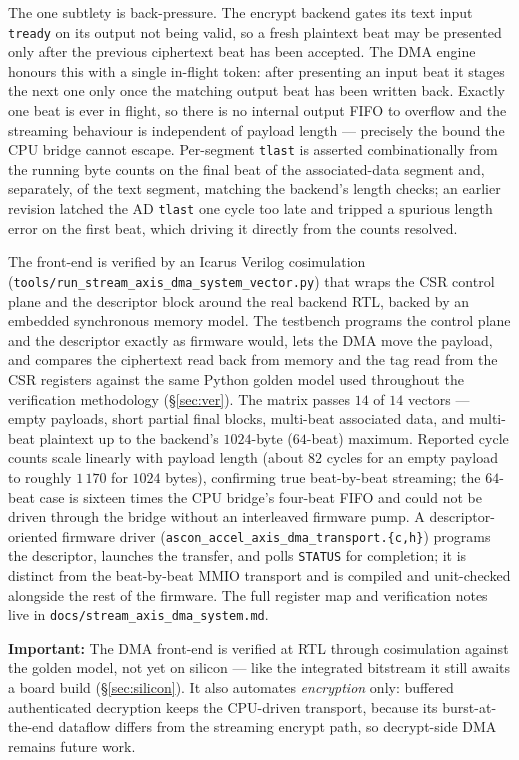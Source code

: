 \documentclass[11pt,a4paper]{article}
\newcommand{\warn}[1]{%
  \begin{tcolorbox}[
    enhanced, colback=warnbg, colframe=warnframe,
    arc=2pt, boxrule=0.5pt, left=6pt, right=6pt, top=3pt, bottom=3pt,
    before upper={\small}
  ]
  \textbf{\color{warnframe}Important:} #1
  \end{tcolorbox}\vspace{3pt}}
\begin{document}
The one subtlety is back-pressure. The encrypt backend gates its text
input \texttt{tready} on its output not being valid, so a fresh
plaintext beat may be presented only after the previous ciphertext beat
has been accepted. The DMA engine honours this with a single in-flight
token: after presenting an input beat it stages the next one only once
the matching output beat has been written back. Exactly one beat is ever
in flight, so there is no internal output FIFO to overflow and the
streaming behaviour is independent of payload length --- precisely the
bound the CPU bridge cannot escape. Per-segment \texttt{tlast} is
asserted combinationally from the running byte counts on the final beat
of the associated-data segment and, separately, of the text segment,
matching the backend's length checks; an earlier revision latched the AD
\texttt{tlast} one cycle too late and tripped a spurious length error on
the first beat, which driving it directly from the counts resolved.

The front-end is verified by an Icarus Verilog cosimulation
(\texttt{tools/run\_stream\_axis\_dma\_system\_vector.py}) that wraps the
CSR control plane and the descriptor block around the real backend RTL,
backed by an embedded synchronous memory model. The testbench programs
the control plane and the descriptor exactly as firmware would, lets the
DMA move the payload, and compares the ciphertext read back from memory
and the tag read from the CSR registers against the same Python golden
model used throughout the verification methodology (§\ref{sec:ver}). The
matrix passes $14$ of $14$ vectors --- empty payloads, short partial
final blocks, multi-beat associated data, and multi-beat plaintext up to
the backend's $1024$-byte ($64$-beat) maximum. Reported cycle counts
scale linearly with payload length (about $82$ cycles for an empty
payload to roughly $1\,170$ for $1024$ bytes), confirming true
beat-by-beat streaming; the $64$-beat case is sixteen times the CPU
bridge's four-beat FIFO and could not be driven through the bridge
without an interleaved firmware pump. A descriptor-oriented firmware
driver (\texttt{ascon\_accel\_axis\_dma\_transport.\{c,h\}}) programs the
descriptor, launches the transfer, and polls \texttt{STATUS} for
completion; it is distinct from the beat-by-beat MMIO transport and is
compiled and unit-checked alongside the rest of the firmware. The full
register map and verification notes live in
\texttt{docs/stream\_axis\_dma\_system.md}.

\warn{The DMA front-end is verified at RTL through cosimulation against
the golden model, not yet on silicon --- like the integrated bitstream
it still awaits a board build (§\ref{sec:silicon}). It also automates
\emph{encryption} only: buffered authenticated decryption keeps the
CPU-driven transport, because its burst-at-the-end dataflow differs from
the streaming encrypt path, so decrypt-side DMA remains future work.}
\end{document}
